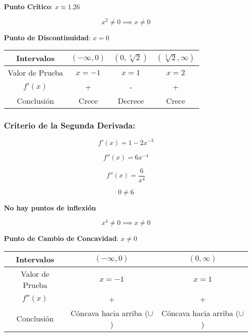 \textbf{Punto Crítico}: \(x \approx 1.26\)

\[
x^2 \neq 0 \implies x \neq 0
\]

\textbf{Punto de Discontinuidad}: \(x = 0\)

\begin{center}
    \begin{tabular}{|c|c|c|c|}
        \hline
        Intervalos & $(-\infty,0)$ & $(0,\sqrt[3]{2})$ & $(\sqrt[3]{2},\infty)$ \\
        \hline
        Valor de Prueba & $x=-1$ & $x=1$ & $x=2$ \\
        \hline
        $f'(x)$ & + & - & + \\
        \hline
        Conclusión & Crece & Decrece & Crece \\
        \hline
    \end{tabular}
\end{center}

\subsubsection*{Criterio de la Segunda Derivada:}

\[
f'(x) = 1 - 2x^{-3}
\]

\[
f''(x) = 6x^{-4}
\]

\[
f''(x) = \frac{6}{x^4}
\]

\[
0 \neq 6
\]

\textbf{No hay puntos de inflexión}

\[
x^4 \neq 0 \implies x \neq 0
\]

\textbf{Punto de Cambio de Concavidad}: \(x \neq 0\)

\begin{center}
    \begin{tabular}{|c|c|c|}
        \hline
        Intervalos & $(-\infty,0)$ & $(0,\infty)$ \\
        \hline
        Valor de Prueba & $x=-1$ & $x=1$ \\
        \hline
        $f''(x)$ & + & + \\
        \hline
        Conclusión & Cóncava hacia arriba ($\cup$) & Cóncava hacia arriba ($\cup$) \\
        \hline
    \end{tabular}
\end{center}


\begin{figure}[H]
    \centering
    
\end{figure}



